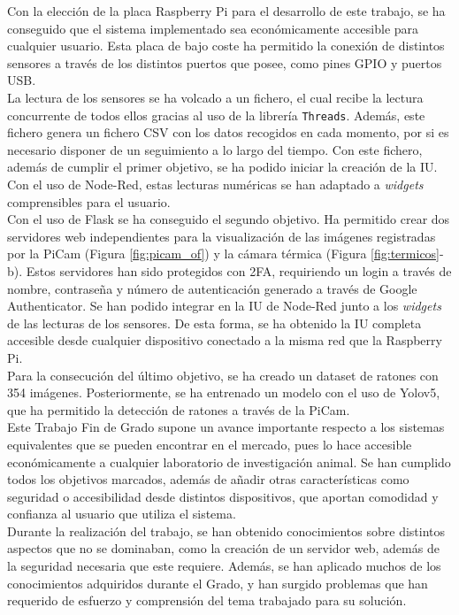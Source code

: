 Con la elección de la placa Raspberry Pi para el desarrollo de este trabajo, se ha conseguido que el sistema implementado sea económicamente accesible para cualquier usuario. Esta placa de bajo coste ha permitido la conexión de distintos sensores a través de los distintos puertos que posee, como pines GPIO y puertos USB.\\

La lectura de los sensores se ha volcado a un fichero, el cual recibe la lectura concurrente de todos ellos gracias al uso de la librería \verb|Threads|. Además, este fichero genera un fichero CSV con los datos recogidos en cada momento, por si es necesario disponer de un seguimiento a lo largo del tiempo. Con este fichero, además de cumplir el primer objetivo, se ha podido iniciar la creación de la IU. Con el uso de Node-Red, estas lecturas numéricas se han adaptado a \textit{widgets} comprensibles para el usuario.\\

Con el uso de Flask se ha conseguido el segundo objetivo. Ha permitido crear dos servidores web independientes para la visualización de las imágenes registradas por la PiCam (Figura \ref{fig:picam_of}) y la cámara térmica (Figura \ref{fig:termicos}-b). Estos servidores han sido protegidos con 2FA, requiriendo un login a través de nombre, contraseña y número de autenticación generado a través de Google Authenticator. Se han podido integrar en la IU de Node-Red junto a los \textit{widgets} de las lecturas de los sensores. De esta forma, se ha obtenido la IU completa accesible desde cualquier dispositivo conectado a la misma red que la Raspberry Pi.\\

Para la consecución del último objetivo, se ha creado un dataset de ratones con 354 imágenes. Posteriormente, se ha entrenado un modelo con el uso de Yolov5, que ha permitido la detección de ratones a través de la PiCam.\\

Este Trabajo Fin de Grado supone un avance importante respecto a los sistemas equivalentes que se pueden encontrar en el mercado, pues lo hace accesible económicamente a cualquier laboratorio de investigación animal. Se han cumplido todos los objetivos marcados, además de añadir otras características como seguridad o accesibilidad desde distintos dispositivos, que aportan comodidad y confianza al usuario que utiliza el sistema.\\

Durante la realización del trabajo, se han obtenido conocimientos sobre distintos aspectos que no se dominaban, como la creación de un servidor web, además de la seguridad necesaria que este requiere. Además, se han aplicado muchos de los conocimientos adquiridos durante el Grado, y han surgido problemas que han requerido de esfuerzo y comprensión del tema trabajado para su solución.\\


